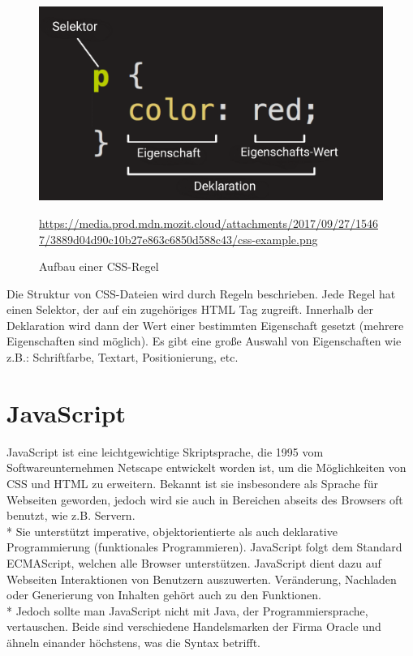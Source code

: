 \begin{figure}[htp]
    \centering
    \includegraphics[scale=0.3]{pics/CSSRegel.png}
    \caption{Aufbau einer CSS-Regel}
        \small \url{https://media.prod.mdn.mozit.cloud/attachments/2017/09/27/15467/3889d04d90c10b27e863c6850d588c43/css-example.png}
    \label{fig:impl:CSSRule}
\end{figure}

Die Struktur von CSS-Dateien wird durch Regeln beschrieben. Jede Regel hat einen Selektor, der auf ein zugehöriges HTML Tag zugreift.
Innerhalb der Deklaration wird dann der Wert einer bestimmten Eigenschaft gesetzt (mehrere Eigenschaften sind möglich).
Es gibt eine große Auswahl von Eigenschaften wie z.B.: Schriftfarbe, Textart, Positionierung, etc. \cite{CSSMozilla}

\section{JavaScript}
\author{Benjamin Besic}
JavaScript ist eine leichtgewichtige Skriptsprache, die 1995 vom Softwareunternehmen Netscape entwickelt worden ist, um die Möglichkeiten von CSS und HTML zu erweitern.
Bekannt ist sie insbesondere als Sprache für Webseiten geworden, jedoch wird sie auch in Bereichen abseits des Browsers oft benutzt, wie z.B. Servern. 
\\* Sie unterstützt imperative, objektorientierte als auch deklarative Programmierung (funktionales Programmieren). JavaScript folgt dem Standard ECMAScript, welchen alle Browser unterstützen. 
JavaScript dient dazu auf Webseiten Interaktionen von Benutzern auszuwerten. Veränderung, Nachladen oder Generierung von Inhalten gehört auch zu den Funktionen.  \\*
Jedoch sollte man JavaScript nicht mit Java, der Programmiersprache, vertauschen. Beide sind verschiedene Handelsmarken der Firma Oracle und ähneln einander höchstens, was die Syntax betrifft.
\cite{JSWiki} \cite{JSMozilla}
